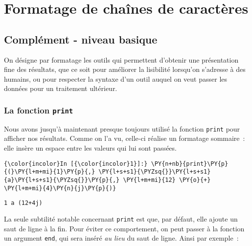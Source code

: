     
    
    
    

    

    \hypertarget{formatage-de-chauxeenes-de-caractuxe8res}{%
\section{Formatage de chaînes de
caractères}\label{formatage-de-chauxeenes-de-caractuxe8res}}

    \hypertarget{compluxe9ment---niveau-basique}{%
\subsection{Complément - niveau
basique}\label{compluxe9ment---niveau-basique}}

    On désigne par formatage les outils qui permettent d'obtenir une
présentation fine des résultats, que ce soit pour améliorer la
lisibilité lorsqu'on s'adresse à des humains, ou pour respecter la
syntaxe d'un outil auquel on veut passer les données pour un traitement
ultérieur.

    \hypertarget{la-fonction-print}{%
\subsubsection{\texorpdfstring{La fonction
\texttt{print}}{La fonction print}}\label{la-fonction-print}}

    Nous avons jusqu'à maintenant presque toujours utilisé la fonction
\texttt{print} pour afficher nos résultats. Comme on l'a vu, celle-ci
réalise un formatage sommaire~: elle insère un espace entre les valeurs
qui lui sont passées.

    \begin{Verbatim}[commandchars=\\\{\},frame=single,framerule=0.3mm,rulecolor=\color{cellframecolor}]
{\color{incolor}In [{\color{incolor}1}]:} \PY{n+nb}{print}\PY{p}{(}\PY{l+m+mi}{1}\PY{p}{,} \PY{l+s+s1}{\PYZsq{}}\PY{l+s+s1}{a}\PY{l+s+s1}{\PYZsq{}}\PY{p}{,} \PY{l+m+mi}{12} \PY{o}{+} \PY{l+m+mi}{4}\PY{n}{j}\PY{p}{)}
\end{Verbatim}


    \begin{Verbatim}[commandchars=\\\{\},frame=single,framerule=0.3mm,rulecolor=\color{cellframecolor}]
1 a (12+4j)
\end{Verbatim}

    La seule subtilité notable concernant \texttt{print} est que, par
défaut, elle ajoute un saut de ligne à la fin. Pour éviter ce
comportement, on peut passer à la fonction un argument \texttt{end}, qui
sera inséré \emph{au lieu} du saut de ligne. Ainsi par exemple~:

